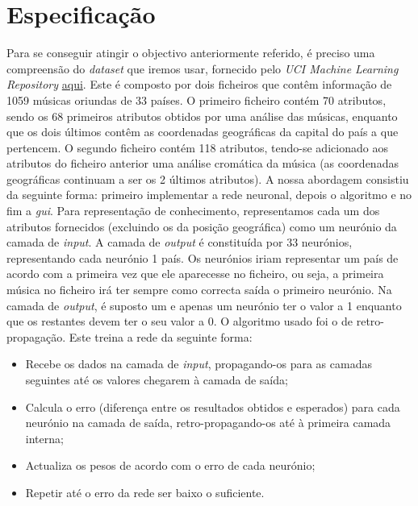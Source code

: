 \documentclass[a4paper]{article}
\begin{document}
\section{Especificação}
Para se conseguir atingir o objectivo anteriormente referido, é preciso uma compreensão do \textit{dataset} que iremos usar, fornecido pelo \textit{UCI Machine Learning Repository} \href{http://tinyurl.com/qcxjzap}{aqui}. Este é composto por dois ficheiros que contêm informação de 1059 músicas oriundas de 33 países. O primeiro ficheiro contém 70 atributos, sendo os 68 primeiros atributos obtidos por uma análise das músicas, enquanto que os dois últimos contêm as coordenadas geográficas da capital do país a que pertencem. O segundo ficheiro contém 118 atributos, tendo-se adicionado aos atributos do ficheiro anterior uma análise cromática da música (as coordenadas geográficas continuam a ser os 2 últimos atributos). \linebreak
A nossa abordagem consistiu da seguinte forma: primeiro implementar a rede neuronal, depois o algoritmo e no fim a \textit{gui}. Para representação de conhecimento, representamos cada um dos atributos fornecidos (excluindo os da posição geográfica) como um neurónio da camada de \textit{input}. A camada de \textit{output} é constituída por 33 neurónios, representando cada neurónio 1 país. Os neurónios iriam representar um país de acordo com a primeira vez que ele aparecesse no ficheiro, ou seja, a primeira música no ficheiro irá ter sempre como correcta saída o primeiro neurónio. Na camada de \textit{output}, é suposto um e apenas um neurónio ter o valor a 1 enquanto que os restantes devem ter o seu valor a 0.\linebreak
O algoritmo usado foi o de retro-propagação. Este treina a rede da seguinte forma:

\begin{itemize}
\item Recebe os dados na camada de \textit{input}, propagando-os para as camadas seguintes até os valores chegarem à camada de saída;
\item  Calcula o erro (diferença entre os resultados obtidos e esperados) para cada neurónio na camada de saída, retro-propagando-os até à primeira camada interna;
\item Actualiza os pesos de acordo com o erro de cada neurónio;
\item Repetir até o erro da rede ser baixo o suficiente.
\end{itemize}
\end{document}
